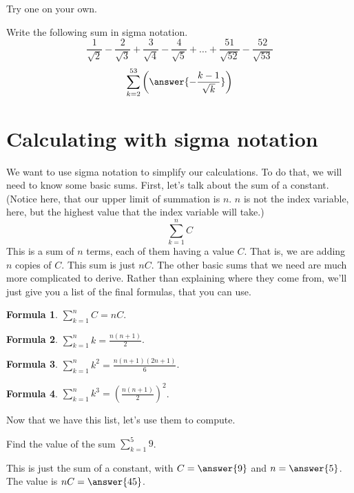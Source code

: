 \documentclass[12pt]{ximera}
\theoremstyle{definition}
\newtheorem{form}{Formula}
\newcommand{\hop}{\vskip 0.18in}
\begin{document}
Try one on your own.
\begin{example}
 	Write the following sum in sigma notation.
 	\[ \frac{1}{\sqrt{2}} - \frac{2}{\sqrt{3}} + \frac{3}{\sqrt{4}} - \frac{4}{\sqrt{5}}+ \ldots + \frac{51}{\sqrt{52}} - \frac{52}{\sqrt{53}} \]
	\[ \sum_{k=2}^{53} \left(  \answer{-\frac{k-1}{\sqrt{k}} } \right) \]

\end{example}
\hop \hop

 
 \section{Calculating with sigma notation}
 We want to use sigma notation to simplify our calculations.  To do that, we will need to know some basic sums.  
 First, let's talk about the sum of a constant.  (Notice here, that our upper limit of summation is $n$.  $n$ is not the index 
 variable, here, but the highest value that the index variable will take.)
 \[ \sum_{k=1}^n C \] 
 This is a sum of $n$ terms, each of them having a value $C$.  That is, we are adding $n$ copies of $C$.  This sum is just $nC$.
 The other basic sums that we need are much more complicated to derive.  Rather than explaining where they come from, we'll just give you
 a list of the final formulas, that you can use.
 
 \begin{form}
 $\displaystyle \sum_{k=1}^n C = nC$.
 \end{form}
\begin{form}
 $\displaystyle \sum_{k=1}^n k = \frac{n(n+1)}{2}$.
\end{form}
\begin{form}
 $\displaystyle \sum_{k=1}^n k^2 = \frac{n(n+1)(2n+1)}{6}$.
\end{form}
\begin{form}
 $\displaystyle \sum_{k=1}^n k^3 = \left(\frac{n(n+1)}{2}\right)^2$.
\end{form} 


Now that we have this list, let's use them to compute.
\begin{example}
	Find the value of the sum $\displaystyle \sum_{k=1}^{5} 9$.
	\begin{explanation}
		This is just the sum of a constant, with $C=\answer{9}$ and $n=\answer{5}$.  The value is $nC=\answer{45}$.	
	\end{explanation}
\end{example}

\hop
\end{document}
